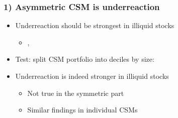 \documentclass[10pt]{beamer}
\begin{document}
\begin{frame}[label=asy_is_underreaction]
\frametitle{1) Asymmetric CSM is underreaction}
\begin{itemize}
    \item Underreaction should be strongest in illiquid stocks 
    \begin{itemize}
        \item \citet{lo1990contrarian}, \citet{hou2007industry}
    \end{itemize}
    \vspace{5pt}
    \item Test: split CSM portfolio into deciles by size:
    \vspace{5pt}
  
\hspace*{-2em}
\resizebox{1.05\textwidth}{!}{

}
\vspace{5pt}

\item Underreaction is indeed stronger in illiquid stocks
\begin{itemize}
    \item Not true in the symmetric part
    \item Similar findings in individual CSMs~\hfill\hyperlink{sort_by_liquidity_individual}{}
\end{itemize}
\end{itemize}

\vspace{30pt}
\end{frame}



\end{document}
